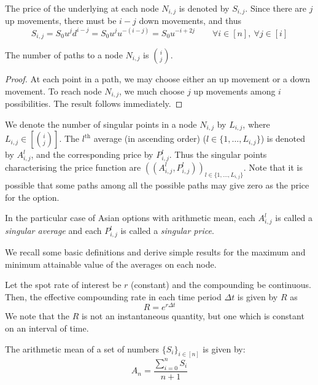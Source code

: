 The price of the underlying at each node $ N_{i,j} $ is denoted by $ S_{i,j} $. Since there are $j$ up movements, there must be $ i-j $ down movements, and thus
\begin{equation} \label{eq:asian-am-ij}
	S_{i,j} = S_0 u^{j} d^{i-j} = S_0 u^{j} u^{-(i-j)} = S_0 u^{-i+2j} \qquad \forall i \in [n], \ \forall j \in [i]
\end{equation}


\begin{prp}
	The number of paths to a node $ N_{i,j} $ is $ \binom{i}{j} $.
\end{prp}

\begin{proof}
	At each point in a path, we may choose either an up movement or a down movement. To reach node $ N_{i,j} $, we much choose $j$ up movements among $i$ possibilities. The result follows immediately.
\end{proof}


We denote the number of singular points in a node $ N_{i,j} $ by $ L_{i,j} $, where $ L_{i,j} \in \left[ \binom{i}{j} \right] $. The $ l^\mathrm{th} $ average (in ascending order) ($ l \in \{ 1, \dots, L_{i,j} \} $) is denoted by $ A_{i,j}^l $, and the corresponding price by $ P_{i,j}^l $. Thus the singular points characterising the price function are $ ( ( A_{i,j}^l, P_{i,j}^l ) )_{l \in \{ 1, \dots, L_{i,j} \} } $. Note that it is possible that some paths among all the possible paths may give zero as the price for the option. 


\begin{dfn}
	In the particular case of Asian options with arithmetic mean, each $ A_{i,j}^l $ is called a \emph{singular average} and each $ P_{i,j}^l $ is called a  \emph{singular price}.
\end{dfn}


We recall some basic definitions and derive simple results for the maximum and minimum attainable value of the averages on each node.

Let the spot rate of interest be $ r $ (constant) and the compounding be continuous. Then, the effective compounding rate in each time period $ \Delta t $ is given by $ R $ as
\begin{equation}
	\label{eq:R}
	R = e^{r \Delta t}
\end{equation}
We note that the $R$ is not an instantaneous quantity, but one which is constant on an interval of time.


\begin{dfn}
	The arithmetic mean of a set of numbers $ \{ S_i \}_{i \in [n]} $ is given by:
	\begin{equation}
		\label{eq:am}
		A_{n} = \frac{\sum_{i=0}^n S_i}{n+1}
	\end{equation}
\end{dfn}


